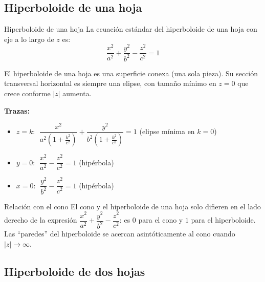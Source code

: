 \subsection{Hiperboloide de una hoja}

\begin{mydefinition}{Hiperboloide de una hoja}
La ecuación estándar del hiperboloide de una hoja con eje a lo largo de $z$ es:
\[
\frac{x^2}{a^2} + \frac{y^2}{b^2} - \frac{z^2}{c^2} = 1
\]
\end{mydefinition}

El hiperboloide de una hoja es una superficie conexa (una sola pieza). Su sección transversal horizontal es siempre una elipse, con tamaño mínimo en $z = 0$ que crece conforme $|z|$ aumenta.

\textbf{Trazas:}
\begin{itemize}
    \item $z = k$: $\;\dfrac{x^2}{a^2\left(1+\frac{k^2}{c^2}\right)} + \dfrac{y^2}{b^2\left(1+\frac{k^2}{c^2}\right)} = 1$ \quad (elipse mínima en $k=0$)
    \item $y = 0$: $\;\dfrac{x^2}{a^2} - \dfrac{z^2}{c^2} = 1$ \quad (hipérbola)
    \item $x = 0$: $\;\dfrac{y^2}{b^2} - \dfrac{z^2}{c^2} = 1$ \quad (hipérbola)
\end{itemize}

\begin{mynote}{Relación con el cono}
El cono y el hiperboloide de una hoja solo difieren en el lado derecho de la expresión $\dfrac{x^2}{a^2}+\dfrac{y^2}{b^2}-\dfrac{z^2}{c^2}$: es $0$ para el cono y $1$ para el hiperboloide. Las ``paredes'' del hiperboloide se acercan asintóticamente al cono cuando $|z|\to\infty$.
\end{mynote}

\begin{center}
\end{center}

\subsection{Hiperboloide de dos hojas}

